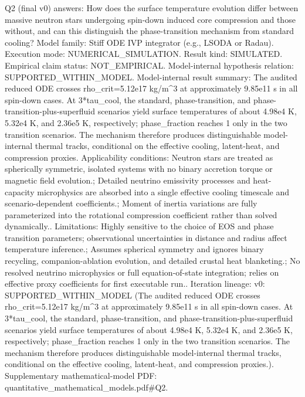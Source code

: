\documentclass[conference]{IEEEtran}
\begin{document}
Q2 (final v0) answers: How does the surface temperature evolution differ between massive neutron stars undergoing spin-down induced core compression and those without, and can this distinguish the phase-transition mechanism from standard cooling? Model family: Stiff ODE IVP integrator (e.g., LSODA or Radau). Execution mode: NUMERICAL\_SIMULATION. Result kind: SIMULATED. Empirical claim status: NOT\_EMPIRICAL. Model-internal hypothesis relation: SUPPORTED\_WITHIN\_MODEL. Model-internal result summary: The audited reduced ODE crosses rho\_crit=5.12e17 kg/m\textasciicircum{}3 at approximately 9.85e11 s in all spin-down cases. At 3*tau\_cool, the standard, phase-transition, and phase-transition-plus-superfluid scenarios yield surface temperatures of about 4.98e4 K, 5.32e4 K, and 2.36e5 K, respectively; phase\_fraction reaches 1 only in the two transition scenarios. The mechanism therefore produces distinguishable model-internal thermal tracks, conditional on the effective cooling, latent-heat, and compression proxies. Applicability conditions: Neutron stars are treated as spherically symmetric, isolated systems with no binary accretion torque or magnetic field evolution.; Detailed neutrino emissivity processes and heat-capacity microphysics are absorbed into a single effective cooling timescale and scenario-dependent coefficients.; Moment of inertia variations are fully parameterized into the rotational compression coefficient rather than solved dynamically.. Limitations: Highly sensitive to the choice of EOS and phase transition parameters; observational uncertainties in distance and radius affect temperature inference.; Assumes spherical symmetry and ignores binary recycling, companion-ablation evolution, and detailed crustal heat blanketing.; No resolved neutrino microphysics or full equation-of-state integration; relies on effective proxy coefficients for first executable run.. Iteration lineage: v0: SUPPORTED\_WITHIN\_MODEL (The audited reduced ODE crosses rho\_crit=5.12e17 kg/m\textasciicircum{}3 at approximately 9.85e11 s in all spin-down cases. At 3*tau\_cool, the standard, phase-transition, and phase-transition-plus-superfluid scenarios yield surface temperatures of about 4.98e4 K, 5.32e4 K, and 2.36e5 K, respectively; phase\_fraction reaches 1 only in the two transition scenarios. The mechanism therefore produces distinguishable model-internal thermal tracks, conditional on the effective cooling, latent-heat, and compression proxies.). Supplementary mathematical-model PDF: quantitative\_mathematical\_models.pdf\#Q2.

\end{document}
